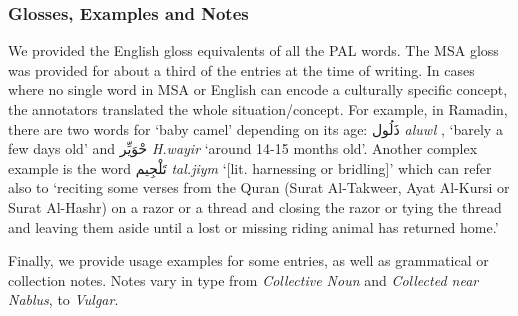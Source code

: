 \subsubsection*{Glosses, Examples and Notes}
We provided the English gloss equivalents of all the PAL words. The MSA gloss was provided for about a third of the entries at the time of writing. 
In cases where no single word in MSA or English can encode a culturally specific concept, the annotators translated the whole situation/concept. 
For example, in Ramadin, there are two words for `baby camel' depending on its age: \foreignlanguage{arabic}{ذَلُول} 
{\it {\DHA}aluwl} , `barely a few days old'  and
\foreignlanguage{arabic}{حْوَيِّر}
{\it H.way{\SHADDA}ir}  `around 14-15 months old'. 
Another complex example is the word \foreignlanguage{arabic}{تَلْجِيم} {\it tal.jiym}  `[lit. harnessing or bridling]' which can refer also to `reciting some verses from the Quran (Surat Al-Takweer, Ayat Al-Kursi or Surat Al-Hashr) on a razor or a thread and closing the razor or tying the thread and leaving them aside until a lost or missing riding animal has returned home.' 

Finally, we provide usage examples for some entries, as well as grammatical or collection notes.  Notes vary in type from {\it Collective Noun} and {\it Collected near Nablus}, to {\it Vulgar}.








